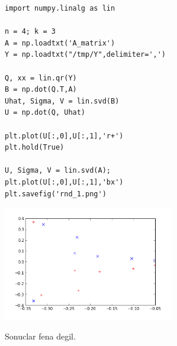 \documentclass[12pt,fleqn]{article}\usepackage{../common}
\begin{document}
\begin{verbatim}
import numpy.linalg as lin

n = 4; k = 3
A = np.loadtxt('A_matrix')
Y = np.loadtxt("/tmp/Y",delimiter=',')

Q, xx = lin.qr(Y)
B = np.dot(Q.T,A)
Uhat, Sigma, V = lin.svd(B)
U = np.dot(Q, Uhat)

plt.plot(U[:,0],U[:,1],'r+')
plt.hold(True)

U, Sigma, V = lin.svd(A);
plt.plot(U[:,0],U[:,1],'bx')
plt.savefig('rnd_1.png')
\end{verbatim}

\includegraphics[height=5cm]{rnd_1.png}

Sonuclar fena degil.
\end{document}
